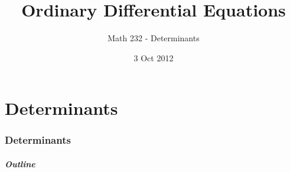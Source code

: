 \part{Determinants}
\section{Determinants}

\title{Ordinary Differential Equations}
\subtitle{Math 232 - Determinants}
\date{3 Oct 2012}

\begin{frame}
  \titlepage
\end{frame}

\begin{frame}
  \frametitle{Outline}
\end{frame}


